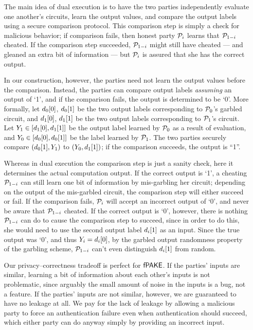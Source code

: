 The main idea of dual execution is to have the two parties independently evaluate one another's circuits, learn the output values, and compare the output labels using a secure comparison protocol.
This comparison step is simply a check for malicious behavior;
if comparison fails, then honest party $\mathcal{P}_{i}$ learns that $\mathcal{P}_{1-i}$ cheated. 
If the comparison step succeeded, $\mathcal{P}_{1-i}$ might still have cheated --- and gleaned an extra bit of information --- but $\mathcal{P}_{i}$ is assured that she has the correct output.

In our construction, however, the parties need not learn the output values before the comparison.
Instead, the parties can compare output labels \emph{assuming} an output of `1', and if the comparison fails, the output is determined to be `0'. 
More formally, 
let $d_{0}[0]$, $d_{0}[1]$ be the two output labels corresponding to $\mathcal{P}_{0}$'s garbled circuit, 
and $d_{1}[0]$, $d_{1}[1]$ be the two output labels corresponding to $\mathcal{P}_{1}$'s circuit.
Let $Y_{1} \in [d_{1}[0], d_{1}[1]]$ be the output label learned by $\mathcal{P}_{0}$ as a result of evaluation, 
and $Y_{0} \in [d_{0}[0], d_{0}[1]]$ be the label learned by $\mathcal{P}_{1}$.
The two parties securely compare $(d_{0}[1], Y_{1})$ to $(Y_{0}, d_{1}[1])$;
if the comparison succeeds, the output is ``1''.

Whereas in dual execution the comparison step is just a sanity check, here it determines the actual computation output.
If the correct output is `1', a cheating $\mathcal{P}_{1-i}$ can still learn one bit of information by mis-garbling her circuit; depending on the output of the mis-garbled circuit, the comparison step will either succeed or fail.
If the comparison fails, $\mathcal{P}_{i}$ will accept an incorrect output of `0', and never be aware that $\mathcal{P}_{1-i}$ cheated.
If the correct output is `0', however, there is nothing $\mathcal{P}_{1-i}$ can do to cause the comparison step to succeed, since in order to do this, she would need to use the second output label $d_{i}[1]$ as an input.
Since the true output was `0', and thus $Y_{i} = d_{i}[0]$,
by the garbled output randomness property of the garbling scheme, $\mathcal{P}_{1-i}$ can't even distinguish $d_{i}[1]$ from random.

Our privacy--correctness tradeoff is perfect for $\textsf{fPAKE}$.
If the parties' inputs are similar, learning a bit of information about each other's inputs is not problematic, since arguably the small amount of noise in the inputs is a bug, not a feature.
If the parties' inputs are not similar, however, we are guaranteed to have no leakage at all. 
We pay for the lack of leakage by allowing a malicious party to force an authentication failure even when authentication should succeed, which either party can do anyway simply by providing an incorrect input.

